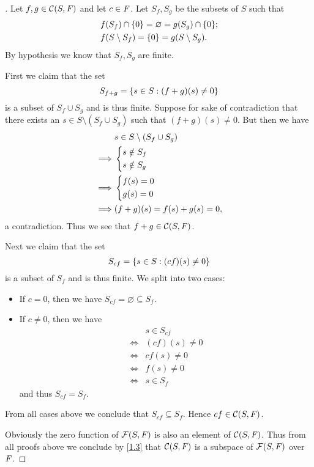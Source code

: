 \begin{proof}[]
	Let \(f, g \in \mathcal{C}(S, \mathit{F})\) and let \(c \in \mathit{F}\).
	Let \(S_f, S_g\) be the subsets of \(S\) such that
	\begin{align*}
		 & f(S_f) \cap \set{0} = \varnothing = g(S_g) \cap \set{0}; \\
		 & f(S \setminus S_f) = \set{0} = g(S \setminus S_g).
	\end{align*}
	By hypothesis we know that \(S_f, S_g\) are finite.

	First we claim that the set
	\[
		S_{f + g} = \left\lbrace s \in S : (f + g)(s) \neq 0\right\rbrace
	\]
	is a subset of \(S_f \cup S_g\) and is thus finite.
	Suppose for sake of contradiction that there exists an \(s \in S \setminus (S_f \cup S_g)\) such that \((f + g)(s) \neq 0\).
	But then we have
	\begin{align*}
		         & s \in S \setminus (S_f \cup S_g) \\
		\implies & \begin{dcases}
			           s \notin S_f \\
			           s \notin S_g
		           \end{dcases}                    \\
		\implies & \begin{dcases}
			           f(s) = 0 \\
			           g(s) = 0
		           \end{dcases}                    \\
		\implies & (f + g)(s) = f(s) + g(s) = 0,
	\end{align*}
	a contradiction.
	Thus we see that \(f + g \in \mathcal{C}(S, \mathit{F})\).

	Next we claim that the set
	\[
		S_{cf} = \left\lbrace s \in S : (cf)(s) \neq 0\right\rbrace
	\]
	is a subset of \(S_f\) and is thus finite.
	We split into two cases:
	\begin{itemize}
		\item  If \(c = 0\), then we have \(S_{cf} = \varnothing \subseteq S_f\).
		\item If \(c \neq 0\), then we have
		      \begin{align*}
			           & s \in S_{cf}   \\
			      \iff & (cf)(s) \neq 0 \\
			      \iff & c f(s) \neq 0  \\
			      \iff & f(s) \neq 0    \\
			      \iff & s \in S_f
		      \end{align*}
		      and thus \(S_{cf} = S_f\).
	\end{itemize}
	From all cases above we conclude that \(S_{cf} \subseteq S_f\).
	Hence \(cf \in \mathcal{C}(S, \mathit{F})\).

	Obviously the zero function of \(\mathcal{F}(S, \mathit{F})\) is also an element of \(\mathcal{C}(S, \mathit{F})\).
	Thus from all proofs above we conclude by \cref{1.3} that \(\mathcal{C}(S, \mathit{F})\) is a subspace of \(\mathcal{F}(S, \mathit{F})\) over \(\mathit{F}\).
\end{proof}

